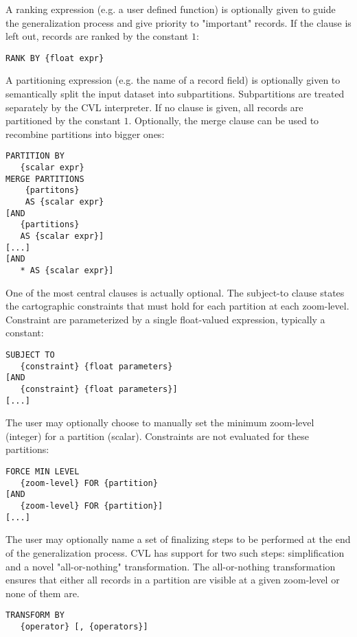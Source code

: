 A ranking expression (e.g. a user defined function) is optionally given to guide the generalization process and give priority to "important" records. If the clause is left out, records are ranked by the constant $1$:

\begin{lstlisting}
RANK BY {float expr}
\end{lstlisting}

A partitioning expression (e.g. the name of a record field) is optionally given to semantically split the input dataset into subpartitions. Subpartitions are treated separately by the CVL interpreter. If no clause is given, all records are partitioned by the constant $1$. Optionally, the merge clause can be used to recombine partitions into bigger ones:

\begin{lstlisting}
PARTITION BY
   {scalar expr}
MERGE PARTITIONS    
    {partitons}
    AS {scalar expr}
[AND 
   {partitions} 
   AS {scalar expr}]
[...]
[AND 
   * AS {scalar expr}]
\end{lstlisting}

One of the most central clauses is actually optional. The subject-to clause states the cartographic constraints that must hold for each partition at each zoom-level. Constraint are parameterized by a single float-valued expression, typically a constant:

\begin{lstlisting}
SUBJECT TO 
   {constraint} {float parameters} 
[AND
   {constraint} {float parameters}]
[...]
\end{lstlisting}

The user may optionally choose to manually set the minimum zoom-level (integer) for a partition (scalar). Constraints are not evaluated for these partitions:

\begin{lstlisting}
FORCE MIN LEVEL
   {zoom-level} FOR {partition}
[AND
   {zoom-level} FOR {partition}]
[...]
\end{lstlisting}

The user may optionally name a set of finalizing steps to be performed at the end of the generalization process. CVL has support for two such steps: simplification and a novel "all-or-nothing" transformation. The all-or-nothing transformation ensures that either all records in a partition are visible at a given zoom-level or none of them are.

\begin{lstlisting}
TRANSFORM BY
   {operator} [, {operators}]
\end{lstlisting}

